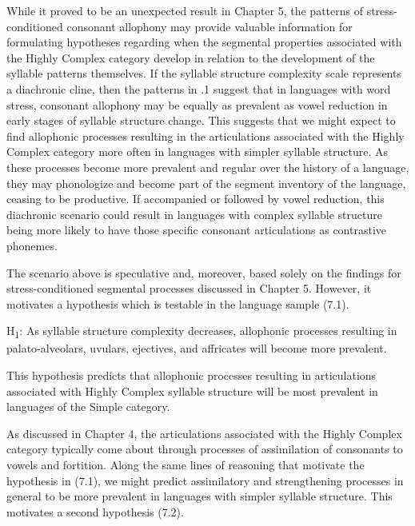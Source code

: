   While it proved to be an unexpected result in Chapter 5, the patterns of stress-conditioned consonant allophony may provide valuable information for formulating hypotheses regarding when the segmental properties associated with the Highly Complex category develop in relation to the development of the syllable patterns themselves. If the syllable structure complexity scale represents a diachronic cline, then the patterns in .1 suggest that in languages with word stress, consonant allophony may be equally as prevalent as vowel reduction in early stages of syllable structure change. This suggests that we might expect to find allophonic processes resulting in the articulations associated with the Highly Complex category more often in languages with simpler syllable structure. As these processes become more prevalent and regular over the history of a language, they may phonologize and become part of the segment inventory of the language, ceasing to be productive. If accompanied or followed by vowel reduction, this diachronic scenario could result in languages with complex syllable structure being more likely to have those specific consonant articulations as contrastive phonemes.



  The scenario above is speculative and, moreover, based solely on the findings for stress-conditioned segmental processes discussed in Chapter 5. However, it motivates a hypothesis which is testable in the language sample (7.1).



\ea\label{ex:(7.1)}
  H\textsubscript{1}: As syllable structure complexity decreases, allophonic processes resulting in palato-alveolars, uvulars, ejectives, and affricates will become more prevalent.
\z



This hypothesis predicts that allophonic processes resulting in articulations associated with Highly Complex syllable structure will be most prevalent in languages of the Simple category.



  As discussed in Chapter 4, the articulations associated with the Highly Complex category typically come about through processes of assimilation of consonants to vowels and fortition. Along the same lines of reasoning that motivate the hypothesis in (7.1), we might predict assimilatory and strengthening processes in general to be more prevalent in languages with simpler syllable structure. This motivates a second hypothesis (7.2).




